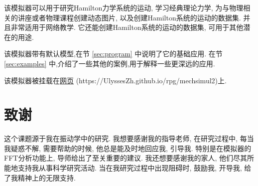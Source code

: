\documentclass[12pt]{article}
\begin{document}
该模拟器可以用于研究Hamilton力学系统的运动,
学习经典理论力学,
为与物理相关的讲座或者物理课程创建动态图片,
以及创建Hamilton系统的运动的数据集.
并且非常适用于网络教学.
它还能创建Hamilton系统的运动的数据集, 可用于其他潜在的用途.

该模拟器带有默认模型,在节 \ref{sec:program} 中说明了它的基础应用.
在节 \ref{sec:examples} 中,介绍了一些其他的案例,用于解释一些更深远的应用.

该模拟器被挂载在\href{https://UlyssesZh.github.io/rpg/mechsimul2}{网页} (https://UlyssesZh.github.io/rpg/mechsimul2)上.

\section{致谢}

这个课题源于我在振动学中的研究.
我想要感谢我的指导老师,
在研究过程中, 每当我疑惑不解, 需要帮助的时候, 他总是能及时地回应我, 引导我.
特别是在模拟器的FFT分析功能上, 导师给出了至关重要的建议.
我还想要感谢我的家人, 他们尽其所能地支持我从事科学研究活动.
当在我研究过程中出现阻碍时, 鼓励我, 开导我, 给了我精神上的无限支持.



\end{document}
